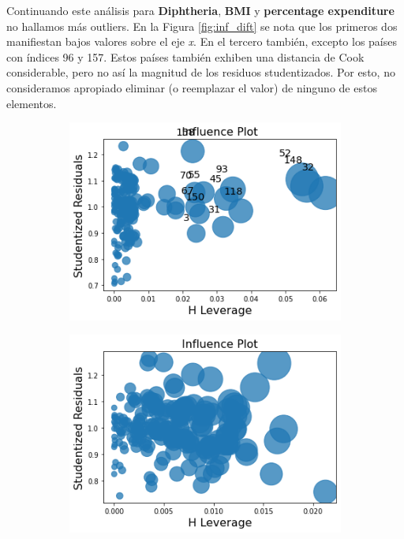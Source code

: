 Continuando este análisis para \textbf{Diphtheria}, \textbf{BMI} y \textbf{percentage expenditure} no hallamos más outliers. En la Figura \ref{fig:inf_dift} se nota que los primeros dos manifiestan bajos valores sobre el eje \textit{x}. En el tercero también, excepto los países con índices 96 y 157. Estos países también exhiben una distancia de Cook considerable, pero no así la magnitud de los residuos studentizados. Por esto, no consideramos apropiado eliminar (o reemplazar el valor) de ninguno de estos elementos.  

\begin{figure}[H]
            \centering
              \begin{subfigure}{0.3\linewidth}
                \centering
                \includegraphics[width=\textwidth]{img/influ/difteria.png}
              \end{subfigure}
              \hfill
                \begin{subfigure}{0.3\linewidth}
                \centering
                \includegraphics[width=\textwidth]{img/influ/bmi.png}

\end{subfigure}
\end{figure}
